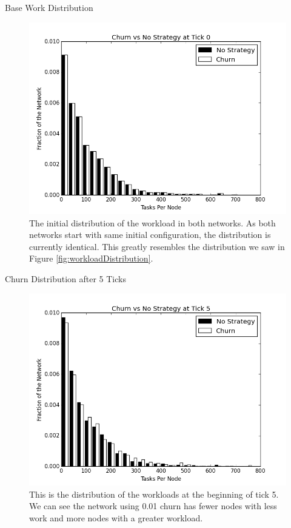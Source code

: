 \documentclass[11pt]{beamer}
\begin{document}
\begin{frame}{Base Work Distribution}
\begin{figure}
	\centering
	\includegraphics[width=0.7\linewidth]{figs/ChurnStableHist0}
	\caption[Workload for churn at tick 0]{The initial distribution of the workload in both networks.  As both networks start with same initial configuration, the distribution is currently identical.  This greatly resembles the distribution we saw in Figure \ref{fig:workloadDistribution}.}
	
	\label{fig:churnStableHist0}
\end{figure}
\end{frame}

\begin{frame}{Churn Distribution after 5 Ticks}
\begin{figure}
	\centering
	\includegraphics[width=0.7\linewidth]{figs/ChurnStableHist5}
	\caption[Workload for churn at tick 5]{This is the distribution of the workloads at the beginning of tick 5.  We can see the network using 0.01 churn has fewer nodes with less work and more nodes with a greater workload.}
	
	\label{fig:churnStableHist5}
\end{figure}
\end{frame}
\end{document}

